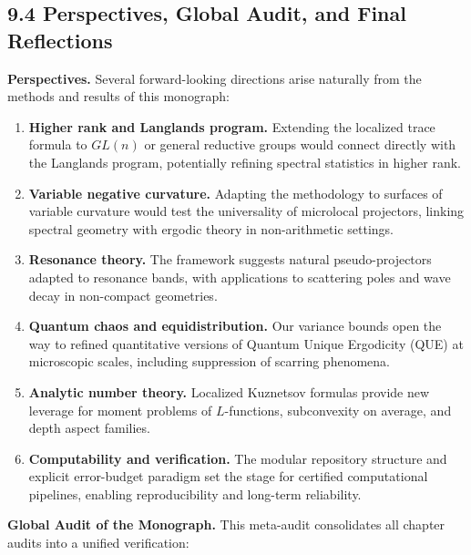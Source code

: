 

\subsection*{9.4 Perspectives, Global Audit, and Final Reflections}

\noindent\textbf{Perspectives.}
Several forward-looking directions arise naturally from the methods
and results of this monograph:

\begin{enumerate}
  \item \textbf{Higher rank and Langlands program.}  
  Extending the localized trace formula to $GL(n)$ or general reductive groups
  would connect directly with the Langlands program,
  potentially refining spectral statistics in higher rank.

  \item \textbf{Variable negative curvature.}  
  Adapting the methodology to surfaces of variable curvature
  would test the universality of microlocal projectors,
  linking spectral geometry with ergodic theory in non-arithmetic settings.

  \item \textbf{Resonance theory.}  
  The framework suggests natural pseudo-projectors adapted to resonance bands,
  with applications to scattering poles and wave decay in non-compact geometries.

  \item \textbf{Quantum chaos and equidistribution.}  
  Our variance bounds open the way to refined quantitative versions
  of Quantum Unique Ergodicity (QUE) at microscopic scales,
  including suppression of scarring phenomena.

  \item \textbf{Analytic number theory.}  
  Localized Kuznetsov formulas provide new leverage
  for moment problems of $L$-functions,
  subconvexity on average, and depth aspect families.

  \item \textbf{Computability and verification.}  
  The modular repository structure and explicit error-budget paradigm
  set the stage for certified computational pipelines,
  enabling reproducibility and long-term reliability.
\end{enumerate}

\medskip

\noindent\textbf{Global Audit of the Monograph.}
This meta-audit consolidates all chapter audits into a unified verification:

